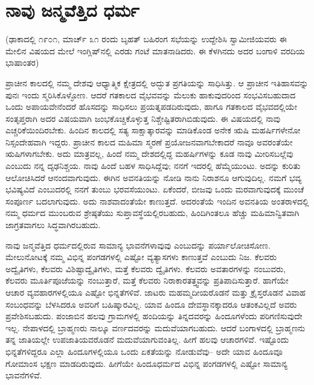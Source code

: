 
\chapter{ನಾವು ಜನ್ಮವೆತ್ತಿದ ಧರ್ಮ}

(ಢಾಕಾದಲ್ಲಿ ೧೯೦೧, ಮಾರ್ಚ್ ೩೧ ರಂದು ಬೃಹತ್​ ಬಹಿರಂಗ ಸಭೆಯನ್ನು ಉದ್ದೇಶಿಸಿ ಸ್ವಾಮೀಜಿಯವರು ಈ ಮೇಲಿನ ವಿಷಯದ ಮೇಲೆ ಇಂಗ್ಲಿಷ್​ನಲ್ಲಿ ಎರಡು ಗಂಟೆ ಮಾತನಾಡಿದರು. ಈ ಕೆಳಗಿನದು ಅದರ ಬಂಗಾಳಿ ವರದಿಯ ಭಾಷಾಂತರ)

ಪ್ರಾಚೀನ ಕಾಲದಲ್ಲಿ ನಮ್ಮ ದೇಶವು ಆಧ್ಯಾತ್ಮಿಕ ಕ್ಷೇತ್ರದಲ್ಲಿ ಅದ್ಭುತ ಪ್ರಗತಿಯನ್ನು ಸಾಧಿಸಿತ್ತು. ಆ ಪ್ರಾಚೀನ ಇತಿಹಾಸವನ್ನು ಪುನಃ ಇಂದು ಸ್ಮರಿಸಿಕೊಳ್ಳೋಣ. ಆದರೆ ಗತಕಾಲದ ವೈಭವವನ್ನು ಮೆಲುಕು ಹಾಕುವುದರಿಂದ ಸಂಭವಿಸಬಹುದಾದ ಒಂದು ಅಪಾಯವೇನೆಂದರೆ ಹೊಸದನ್ನು ಸಾಧಿಸಲು ಪ್ರಯತ್ನಪಡದಿರುವುದು, ಹಾಗೂ ಗತಕಾಲದ ವೈಭವದಲ್ಲಿಯೇ ಸಂತೃಪ್ತರಾಗಿ ಅದರ ವಿಷಯವಾಗಿ ಜಂಭಕೊಚ್ಚಿಕೊಳ್ಳುತ್ತ ನಿಶ್ಚೇಷ್ಟಿತರಾಗಿಬಿಡುವುದು. ಈ ವಿಷಯದಲ್ಲಿ ನಾವು ಎಚ್ಚರಿಕೆಯಿಂದಿರಬೇಕು. ಹಿಂದಿನ ಕಾಲದಲ್ಲಿ ಸತ್ಯ ಸಾಕ್ಷಾತ್ಕಾರವನ್ನು ಮಾಡಿಕೊಂಡ ಅನೇಕ ಋಷಿ ಮಹರ್ಷಿಗಳೇನೋ ನಿಸ್ಸಂದೇಹವಾಗಿ ಇದ್ದರು. ಪ್ರಾಚೀನ ಕಾಲದ ಮಹಿಮಾ ಸ್ಮರಣೆ ಪ್ರಯೋಜನವಾಗಬೇಕಾದರೆ ನಾವೂ ಅವರಂತೆಯೇ ಋಷಿಗಳಾಗಬೇಕು. ಅದು ಮಾತ್ರವಲ್ಲ, ಹಿಂದೆ ನಮ್ಮ ದೇಶದಲ್ಲಿದ್ದ ಮಹರ್ಷಿಗಳನ್ನು ಕೂಡ ನಾವು ಮೀರಿಸಬಲ್ಲೆವು ಎಂಬುದು ನನ್ನ ದೃಢನಿಶ್ಚಯ. ನಾವು ಹಿಂದೆ ಬಹಳ ಸಾಧಿಸಿದ್ದೆವು; ನನಗೆ ಇದರಲ್ಲಿ ಹೆಮ್ಮೆಯುಂಟು. ಅದನ್ನು ಕುರಿತು ಆಲೋಚಿಸಿದರೆ ಆನಂದವಾಗುವುದು. ಈಗಿನ ಅವನತಿಯನ್ನು ನೋಡಿ ನಾನು ನಿರಾಶನೂ ಆಗುವುದಿಲ್ಲ. ನಮಗೆ ಭವ್ಯ ಭವಿಷ್ಯವಿದೆ ಎಂಬುದರಲ್ಲಿ ನನಗೆ ತುಂಬು ಭರವಸೆಯುಂಟು. ಏಕೆಂದರೆ, ಬೀಜವು ಒಂದು ಮರವಾಗುವುದಕ್ಕೆ ಮುಂಚೆ ಸಂಪೂರ್ಣ ಬದಲಾಗುವುದು. ಅದು ನಾಶವಾದಂತೆಯೇ ಕಾಣುತ್ತದೆ. ಅದರಂತೆಯೆ ಇಂದಿನ ಅವನತಿಯ ಅಂತರಾಳದಲ್ಲಿ ನಮ್ಮ ಧರ್ಮದ ಮುಂಬರುವ ಶ್ರೇಷ್ಠತೆಯು ಸುಪ್ತಾವಸ್ಥೆಯಲ್ಲಿರಬಹುದು, ಹಿಂದಿಗಿಂತಲೂ ಹೆಚ್ಚು ಮಹಿಮಾನ್ವಿತವಾಗಿ ಜಾಗ್ರತವಾಗಲು ಸಿದ್ಧವಾಗಿರಬಹುದು.

\vskip 4pt

ನಾವು ಜನ್ಮವೆತ್ತಿದ ಧರ್ಮದಲ್ಲಿರುವ ಸಾಮಾನ್ಯ ಭಾವನೆಗಳಾವುವು ಎಂಬುದನ್ನು ಪರ್ಯಾಲೋಚಿಸೋಣ. ಮೇಲುನೋಟಕ್ಕೆ ನಮ್ಮ ವಿಭಿನ್ನ ಪಂಗಡಗಳಲ್ಲಿ ಎಷ್ಟೋ ವ್ಯತ್ಯಾಸಗಳು ಕಾಣುತ್ತವೆ ಎಂಬುದು ನಿಜ. ಕೆಲವರು ಅದ್ವೈತಿಗಳು, ಕೆಲವರು ವಿಶಿಷ್ಟಾದ್ವೈತಿಗಳು, ಮತ್ತೆ ಕೆಲವರು ದ್ವೈತಿಗಳು. ಕೆಲವರು ಅವತಾರಗಳನ್ನು ನಂಬುವರು, ಕೆಲವರು ಮೂರ್ತಿಪೂಜೆಯನ್ನು ನಂಬುತ್ತಾರೆ, ಮತ್ತೆ ಕೆಲವರು ನಿರಾಕಾರತತ್ತ್ವವನ್ನು ಪ್ರತಿಪಾದಿಸುತ್ತಾರೆ. ಹಾಗೆಯೇ ಆಚಾರ ವ್ಯವಹಾರಗಳಲ್ಲಿಯೂ ಎಷ್ಟೋ ಭಿನ್ನತೆಗಳಿವೆ. ಜಾಟರು ಮಹಮ್ಮದೀಯರೊಡನೆ ಮತ್ತು ಕ್ರೈಸ್ತರೊಡನೆ ವಿವಾಹ ಸಂಬಂಧವನ್ನು ಬೆಳಸಿದರೂ ಅವರಿಗೆ ಬಹಿಷ್ಕಾರವಿಲ್ಲ. ಯಾವ ಹಿಂದೂ ದೇವಸ್ಥಾನಕ್ಕಾದರೂ ಆತಂಕವಿಲ್ಲದೆ ಅವರು ಪ್ರವೇಶಿಸಬಹುದು. ಪಂಜಾಬಿನ ಹಲವು ಗ್ರಾಮಗಳಲ್ಲಿ ಹಂದಿಯನ್ನು ತಿನ್ನದವರನ್ನು ಹಿಂದೂಗಳೆಂದು ಪರಿಗಣಿಸುವುದೇ ಇಲ್ಲ. ನೇಪಾಳದಲ್ಲಿ ಬ್ರಾಹ್ಮಣರು ನಾಲ್ಕೂ ವರ್ಣದವರನ್ನು ಮದುವೆಯಾಗಬಹುದು. ಆದರೆ ಬಂಗಾಳದಲ್ಲಿ ಬ್ರಾಹ್ಮಣನು ತನ್ನ ಜಾತಿಯಲ್ಲೇ ಉಪಜಾತಿಯವರೊಡನೆ ಮದುವೆಯಾಗುವಂತಿಲ್ಲ. ಹೀಗೆ ಹಲವು ಆಚಾರಗಳಿವೆ. ಇಷ್ಟೊಂದು ಭಿನ್ನತೆಗಳಿದ್ದರೂ ಎಲ್ಲಾ ಹಿಂದೂಗಳಲ್ಲಿಯೂ ಒಂದು ಏಕತೆಯನ್ನು ನೋಡುವೆವು– ಅದೇ ಯಾವ ಹಿಂದೂವೂ ಗೋಮಾಂಸ ಭಕ್ಷಣ ಮಾಡದಿರುವುದು. ಹೀಗೆಯೇ ಹಿಂದೂಧರ್ಮದ ವಿಭಿನ್ನ ಪಂಗಡಗಳಲ್ಲಿ ಎಷ್ಟೋ ಸಾಮಾನ್ಯ ಭಾವನೆಗಳಿವೆ.

\vskip 4pt


